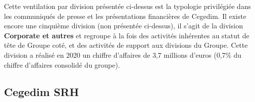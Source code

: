 \par\bigskip
\begin{beware}[title=Note : ]
Cette ventilation par division présentée ci-dessus est la typologie privilégiée dans les communiqués de presse et les présentations financières de Cegedim. Il existe encore une cinquième division (non présentée ci-dessus), il s'agit de la division \textbf{Corporate et autres} et regroupe à la fois des activités inhérentes au statut de tête de Groupe coté, et des activités de support aux divisions du Groupe.
Cette division a réalisé en 2020 un chiffre d'affaires de 3,7 millions d'euros
(0,7\% du chiffre d'affaires consolidé du groupe). 

\end{beware}
\subsection{Cegedim SRH}
